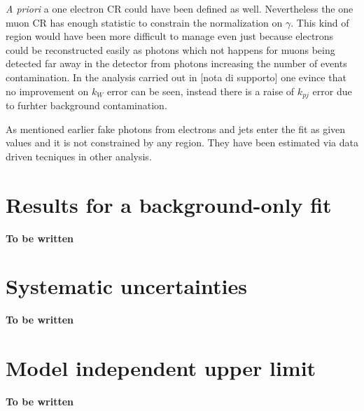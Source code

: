{\itshape A priori} a one electron CR could have been defined as well. Nevertheless the one muon CR has enough statistic to constrain the normalization on \Wboson$\gamma$.  This kind of region would have been more difficult to manage even just because electrons could be reconstructed easily as photons which not happens for muons being detected far away in the detector from photons increasing the number of \gj events contamination. In the analysis carried out in [nota di supporto] one evince that no improvement on $k_W$ error can be seen, instead there is a raise of $k_{pj}$ error due to furhter background contamination.

As mentioned earlier fake photons from electrons and jets enter the fit as given values and it is not constrained by any region. They have been estimated via data driven tecniques in other analysis.

\section{Results for a background-only fit}
\bfseries To be written
\lipsum[2]

\section{Systematic uncertainties}
\bfseries To be written
\lipsum[3]
        
\section{Model independent upper limit}
\bfseries To be written
\lipsum[4]
